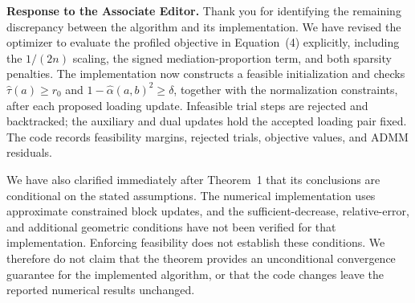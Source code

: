 \noindent\textbf{Response to the Associate Editor.}
Thank you for identifying the remaining discrepancy between the algorithm
and its implementation. We have revised the optimizer to evaluate the
profiled objective in Equation~(4) explicitly, including the $1/(2n)$
scaling, the signed mediation-proportion term, and both sparsity penalties.
The implementation now constructs a feasible initialization and checks
$\widehat\tau(a)\ge r_0$ and
$1-\widehat\alpha(a,b)^2\ge\delta$, together with the normalization
constraints, after each proposed loading update. Infeasible trial steps
are rejected and backtracked; the auxiliary and dual updates hold the
accepted loading pair fixed. The code records feasibility margins,
rejected trials, objective values, and ADMM residuals.

We have also clarified immediately after Theorem~1 that its conclusions
are conditional on the stated assumptions. The numerical implementation
uses approximate constrained block updates, and the sufficient-decrease,
relative-error, and additional geometric conditions have not been verified
for that implementation. Enforcing feasibility does not establish these
conditions. We therefore do not claim that the theorem provides an
unconditional convergence guarantee for the implemented algorithm, or
that the code changes leave the reported numerical results unchanged.
